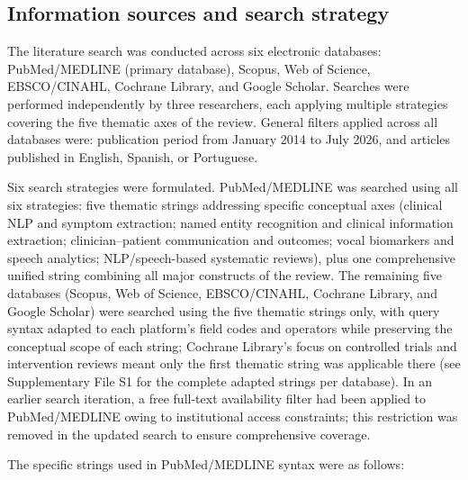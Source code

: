 \documentclass[review,12pt]{elsarticle}
\begin{document}
\subsection{Information sources and search strategy}

The literature search was conducted across six electronic databases:
PubMed/MEDLINE (primary database), Scopus, Web of Science, EBSCO/CINAHL,
Cochrane Library, and Google Scholar. Searches were performed independently
by three researchers, each applying multiple strategies covering the five
thematic axes of the review. General filters applied across all databases
were: publication period from January 2014 to July 2026, and articles
published in English, Spanish, or Portuguese.

Six search strategies were formulated. PubMed/MEDLINE was searched using
all six strategies: five thematic strings addressing specific conceptual axes
(clinical NLP and symptom extraction; named entity recognition and clinical
information extraction; clinician--patient communication and outcomes; vocal
biomarkers and speech analytics; NLP/speech-based systematic reviews), plus
one comprehensive unified string combining all major constructs of the
review. The remaining five databases (Scopus, Web of Science, EBSCO/CINAHL,
Cochrane Library, and Google Scholar) were searched using the five thematic
strings only, with query syntax adapted to each platform's field codes and
operators while preserving the conceptual scope of each string; Cochrane
Library's focus on controlled trials and intervention reviews meant only
the first thematic string was applicable there (see Supplementary File S1
for the complete adapted strings per database). In an earlier search
iteration, a free full-text availability filter had been applied to
PubMed/MEDLINE owing to institutional access constraints; this restriction
was removed in the updated search to ensure comprehensive coverage.

The specific strings used in PubMed/MEDLINE syntax were as follows:
\end{document}
